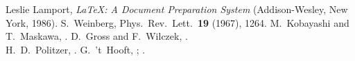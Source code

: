 \begin{thebibliography}{99}
    Leslie Lamport, {\it LaTeX{\rm :} A Document Preparation System} 
    (Addison-Wesley, New York, 1986).
    S.~Weinberg, Phys.\ Rev.\ Lett.\ {\bf 19} (1967), 1264.
    M.~Kobayashi and T.~Maskawa, .
    D.~Gross and F.~Wilczek, .
  \\
    H.~D.~Politzer, .
    G.~'t~Hooft, ; .
\end{thebibliography}



